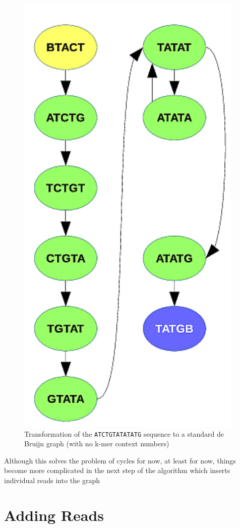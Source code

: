 \begin{figure}[h]
	\centering
	\includegraphics{img/ref-db.pdf}
	\caption{Transformation of the \texttt{ATCTGTATATATG} sequence to a standard de Bruijn graph (with no k-mer context numbers)}
	\label{fig:ref-db}
\end{figure}

Although this solves the problem of cycles for now, at least for now, things become more complicated in the next step of the algorithm which inserts individual reads into the graph

\section{Adding Reads}
\label{sec:adding-reads}

